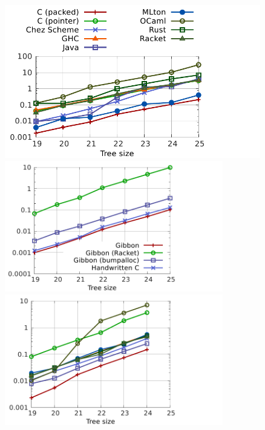 \documentclass[a4paper,english]{lipics-v2016}
\begin{document}
\begin{figure}[t]
  \vspace{-4mm}
  \centering
  \hspace{12mm}
  \includegraphics[width=4.4in]{./figs/shootout_add1.pdf}

\begin{minipage}{1.02\textwidth}
\hspace{-5mm}      
  \begin{minipage}{.48\textwidth}
    \centering
    \includegraphics[width=3.75in]{./figs/shootout_buildtree.pdf}    
  \end{minipage}
  \hspace{3mm}
  \begin{minipage}{.48\textwidth}
    \centering
        \includegraphics[width=3.75in]{./figs/shootout_sumtree.pdf}
  \end{minipage}


\end{minipage}
\end{figure}
\end{document}
